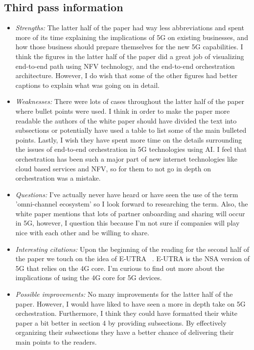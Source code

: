 \documentclass[letterpaper,twocolumn,10pt]{article}
\begin{document}
\subsection{Third pass information}
\label{sec:third}
\begin{itemize}

\item {\it Strengths:} 
The latter half of the paper had way less abbreviations and spent more of its time explaining the implications of 5G 
on existing businesses, and how those business should prepare themselves for the new 5G capabilities. I think the
figures in the latter half of the paper did a great job of visualizing end-to-end path using NFV technology, and the 
end-to-end orchestration architecture. However, I do wish that some of the other figures had better captions to 
explain what was going on in detail.  

\item {\it Weaknesses:} 
There were lots of cases throughout the latter half of the paper where bullet points were used. I think in order to make
the paper more readable the authors of the white paper should have divided the text into subsections or potentially 
have used a table to list some of the main bulleted points. Lastly, I wish they have spent more time on the details
surrounding the issues of end-to-end orchestration in 5G technologies using AI. I feel that orchestration has been 
such a major part of new internet technologies like cloud based services and NFV, so for them to not go in depth
on orchestration was a mistake. 

\item {\it Questions:} 
I've actually never have heard or have seen the use of the term 'omni-channel ecosystem' so I look forward to 
researching the term. Also, the white paper mentions that lots of partner onboarding and sharing will occur in 5G,
however, I question this because I'm not sure if companies will play nice with each other and be willing to share. 

\item {\it Interesting citations:}
Upon the beginning of the reading for the second half of the paper we touch on the idea of E-UTRA ~\cite{3gppeutra}.
E-UTRA is the NSA version of 5G that relies on the 4G core. I'm curious to find out more about the 
implications of using the 4G core for 5G devices.  

\item {\it Possible improvements:} 
No many improvements for the latter half of the paper. However, I would have liked to have seen a more in depth
take on 5G orchestration. Furthermore, I think they could have formatted their white paper a bit better in section
4 by providing subsections. By effectively organizing their subsections they have a better chance of delivering 
their main points to the readers. 


\end{itemize}
\end{document}
